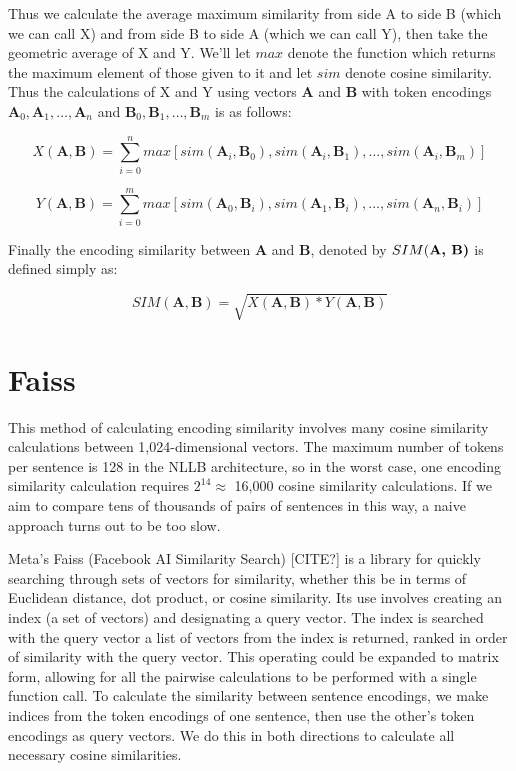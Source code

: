 Thus we calculate the average maximum similarity from side A to side B (which we can call X) and from side B to side A (which we can call Y), then take the geometric average of X and Y. We'll let $max$ denote the function which returns the maximum element of those given to it and let $sim$ denote cosine similarity. Thus the calculations of X and Y using vectors \textbf{A} and \textbf{B} with token encodings 
$\textbf{A}_0, \textbf{A}_1, \dots, \textbf{A}_n$ and 
$\textbf{B}_0, \textbf{B}_1, \dots, \textbf{B}_m$ is as follows:

\[ X(\textbf{A},\textbf{B}) = \sum_{i=0}^{n} max[sim(\textbf{A}_{i}, \textbf{B}_0), sim(\textbf{A}_{i}, \textbf{B}_1), \dots , sim(\textbf{A}_{i}, \textbf{B}_m)]\]

\[ Y(\textbf{A}, \textbf{B}) = \sum_{i=0}^{m} max[sim(\textbf{A}_{0}, \textbf{B}_i), sim(\textbf{A}_{1}, \textbf{B}_i), \dots , sim(\textbf{A}_{n}, \textbf{B}_{i})]\]

Finally the encoding similarity between \textbf{A} and \textbf{B}, denoted by $SIM(\textbf{{A}, \textbf{B})}$ is defined simply as:

\[SIM(\textbf{A}, \textbf{B}) = \sqrt{X(\textbf{A}, \textbf{B}) * Y(\textbf{A}, \textbf{B})}\]

\section{Faiss} 

This method of calculating encoding similarity involves many cosine similarity calculations between 1,024-dimensional vectors. The maximum number of tokens per sentence is 128 in the NLLB architecture, so in the worst case, one encoding similarity calculation requires $2^{14} \approx$ 16,000 cosine similarity calculations. If we aim to compare tens of thousands of pairs of sentences in this way, a naive approach turns out to be too slow. 

Meta's Faiss (Facebook AI Similarity Search) [CITE?] is a library for quickly searching through sets of vectors for similarity, whether this be in terms of Euclidean distance, dot product, or cosine similarity. Its use involves creating an index (a set of vectors) and designating a query vector. The index is searched with the query vector a list of vectors from the index is returned, ranked in order of similarity with the query vector. This operating could be expanded to matrix form, allowing for all the pairwise calculations to be performed with a single function call. To calculate the similarity between sentence encodings, we make indices from the token encodings of one sentence, then use the other's token encodings as query vectors. We do this in both directions to calculate all necessary cosine similarities. 

